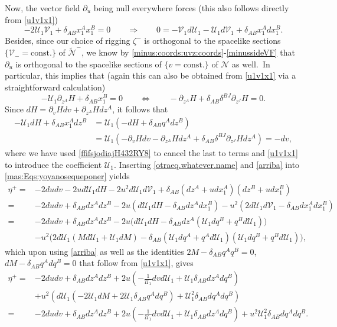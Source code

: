 \documentclass[11pt]{article}
\numberwithin{equation}{section}
\def\flatp{\eta^+}
\def\qfunction{q}
\newcommand{\nn}{\nonumber}
\newcommand\N{\mathcal N}
\newcommand\rig{\zeta}
\newcommand{\cp}{\partial}
\newcommand{\lp}{\left(}
\newcommand{\rp}{\right)}
\newcommand{\cu}{\mathcal{U}}
\newcommand{\cv}{\mathcal{V}}
\newcommand{\nullhyp}{\widetilde{\N}}
\begin{document}
Now, the vector field $\cp_u$ being null everywhere forces (this also follows directly from \eqref{u1v1x1}) 
\begin{equation}
\label{otraeq.whatever.name}-2\cu_1\cv_1+\delta_{AB}x^A_1x^B_1=0\qquad\Longrightarrow\qquad0=-\cv_1d\cu_1-\cu_1d\cv_1+\delta_{AB}x^A_1dx^B_1.
\end{equation}
Besides, since our choice of rigging $\rig^-$ is orthogonal to the spacelike sections $\{\cv_{-}=\text{const.}\}$ of $\nullhyp^-$, 
we know by \eqref{minus:coords:uvz:coords}-\eqref{minussideVF} that $\cp_u$ is orthogonal to the spacelike sections of $\{v=\text{const.}\}$ of $\N$ as well.\ In particular, this implies that (again this can also be obtained from \eqref{u1v1x1} via a straightforward calculation)
\begin{equation}
\label{ffifsjodiajH432RY8}-\cu_1\cp_{z^A}H+\delta_{AB}x^B_1=0\qquad\Longleftrightarrow\qquad-\cp_{z^A}H+\delta_{AB}\delta^{BJ}\cp_{z^J}H=0.
\end{equation}
Since $dH=\cp_vHdv+\cp_{z^A}Hdz^A$, it follows that 
\begin{align}
\nn -\cu_1 dH+\delta_{AB}x_1^Adz^B&= \cu_1 (- dH+\delta_{AB}\qfunction^Adz^B)\\
\label{arriba} &= \cu_1(- \cp_vHdv-\cp_{z^A}Hdz^A+\delta_{AB}\delta^{BJ}\cp_{z^J}Hdz^A)=-dv,
\end{align}
where we have used \eqref{ffifsjodiajH432RY8} to cancel the last to terms and \eqref{u1v1x1} to introduce the coefficient $\cu_1$. Inserting \eqref{otraeq.whatever.name} and \eqref{arriba} into \eqref{mas:Eqs:yoyanosequeponer} yields
\begin{align}
\nonumber \flatp=&-2dudv-2ud\cu_1dH-2u^2d\cu_1d\cv_1+\delta_{AB}\lp dz^A+udx_1^A\rp \lp  dz^B+udx_1^B\rp\\
\nonumber =&-2dudv +\delta_{AB}dz^Adz^B-2u\lp d\cu_1dH-\delta_{AB}dz^Adx_1^B\rp
-u^2\lp 2d\cu_1d\cv_1-\delta_{AB}dx_1^Adx_1^B\rp\\
\nonumber =&-2dudv +\delta_{AB}dz^Adz^B-2u\Big( d\cu_1dH-\delta_{AB}dz^A\lp \cu_1d\qfunction^B+\qfunction^Bd\cu_1\rp\Big)\\
\nonumber &-u^2\Big( 2d\cu_1\lp Md\cu_1+\cu_1dM\rp-\delta_{AB}\lp \cu_1d\qfunction^A+\qfunction^Ad\cu_1\rp\lp \cu_1d\qfunction^B+\qfunction^Bd\cu_1\rp\Big),
\end{align}
which upon using \eqref{arriba} as well as the identities  $2M-\delta_{AB}\qfunction^A\qfunction^B=0$, $dM-\delta_{AB}\qfunction^Ad\qfunction^B=0$ that follow from \eqref{u1v1x1}, gives 
\begin{align}
\nonumber \flatp=&-2dudv +\delta_{AB}dz^Adz^B+2u\lp -\frac{1}{\cu_1}dvd\cu_1+\cu_1\delta_{AB}dz^A d\qfunction^B\rp\\
\nonumber &+u^2\lp d\cu_1\lp -2\cu_1dM+2\cu_1\delta_{AB}\qfunction^Ad\qfunction^B\rp+\cu_1^2\delta_{AB}d\qfunction^Ad\qfunction^B\rp\\
\nonumber =&-2dudv +\delta_{AB}dz^Adz^B+2u\lp -\frac{1}{\cu_1}dvd\cu_1+\cu_1\delta_{AB}dz^A d\qfunction^B\rp+u^2\cu_1^2\delta_{AB}d\qfunction^Ad\qfunction^B.
\end{align}
\end{document}
